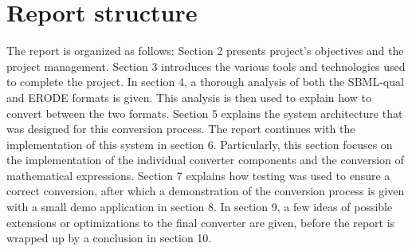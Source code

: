 \section{Report structure}

The report is organized as follows: Section 2 presents project's objectives and the project management. Section 3 introduces the various tools and technologies used to complete the project. In section 4, a thorough analysis of both the SBML-qual and ERODE formats is given. This analysis is then used to explain how to convert between the two formats. Section 5 explains the system architecture that was designed for this conversion process. The report continues with the implementation of this system in section 6. Particularly, this section focuses on the implementation of the individual converter components and the conversion of mathematical expressions. Section 7 explains how testing was used to ensure a correct conversion, after which a demonstration of the conversion process is given with a small demo application in section 8. In section 9, a few ideas of possible extensions or optimizations to the final converter are given, before the report is wrapped up by a conclusion in section 10.

